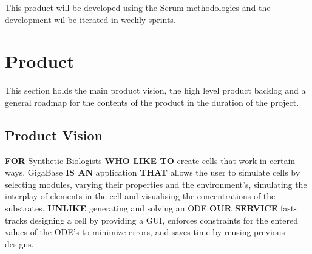 \documentclass[10pt,a4paper]{report}
\begin{document}
This product will be developed using the Scrum methodologies and the development wil be iterated in weekly sprints.

	\clearpage

	\section{Product}
		This section holds the main product vision, the high level product backlog and a general roadmap for the contents of the product in the duration of the project.
		\subsection{Product Vision}
			\textbf{FOR} Synthetic Biologists \textbf{WHO LIKE TO} create cells that work in certain ways, GigaBase \textbf{IS AN} application \textbf{THAT} allows the user to simulate cells by selecting modules, varying their properties and the environment’s, simulating the interplay of elements in the cell and visualising the concentrations of the substrates. \textbf{UNLIKE} generating and solving an ODE \textbf{OUR SERVICE} fast-tracks designing a cell by providing a GUI, enforces constraints for the entered values of the ODE's to minimize errors, and saves time by reusing previous designs.
\end{document}

